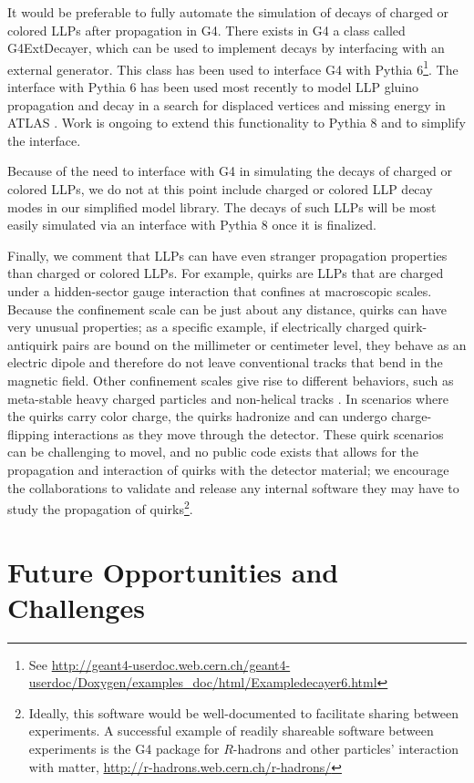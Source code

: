 It would be preferable to fully automate the simulation of decays of charged or colored LLPs after propagation in G4. There exists in G4 a class called G4ExtDecayer, which can be used to implement decays by interfacing with an external generator. This class has been used to interface G4 with Pythia 6\footnote{See \url{http://geant4-userdoc.web.cern.ch/geant4-userdoc/Doxygen/examples_doc/html/Exampledecayer6.html}}. The interface with Pythia 6 has been used most recently to model LLP gluino propagation and decay in a search for displaced vertices and missing energy in ATLAS \cite{ATLAS2017a}. Work is ongoing to extend this functionality to Pythia 8 and to simplify the interface.

Because of the need to interface with G4 in simulating the decays of charged or colored LLPs, we do not at this point include charged or colored LLP decay modes in our simplified model library. The decays of such LLPs will be most easily simulated via an interface with Pythia 8 once it is finalized.

Finally, we comment that LLPs can have even stranger propagation properties than charged or colored LLPs. For example, quirks are LLPs that are charged under a hidden-sector gauge interaction that confines at macroscopic scales. Because the confinement scale can be just about any distance, quirks can have very unusual properties; as a specific example, if electrically charged quirk-antiquirk pairs are bound on the millimeter or centimeter level, they behave as an electric dipole and therefore do not leave conventional tracks that bend in the magnetic field. Other confinement scales give rise to different behaviors, such as meta-stable heavy charged particles and non-helical tracks \cite{Farina:2017cts,Knapen:2017kly}. In scenarios where the quirks carry color charge, the quirks hadronize and can undergo charge-flipping interactions as they move through the detector. These quirk scenarios can be challenging to movel, and no public code exists that allows for the propagation and interaction of quirks with the detector material; we encourage the collaborations to validate and release any internal software they may have to study the propagation of quirks\footnote{Ideally, this software would be well-documented to facilitate sharing between experiments. A successful example of readily shareable software between experiments is the G4 package for $R$-hadrons and other particles' interaction with matter, \url{http://r-hadrons.web.cern.ch/r-hadrons/}}.


\section{Future Opportunities and Challenges}\label{sec:simplified_future}

